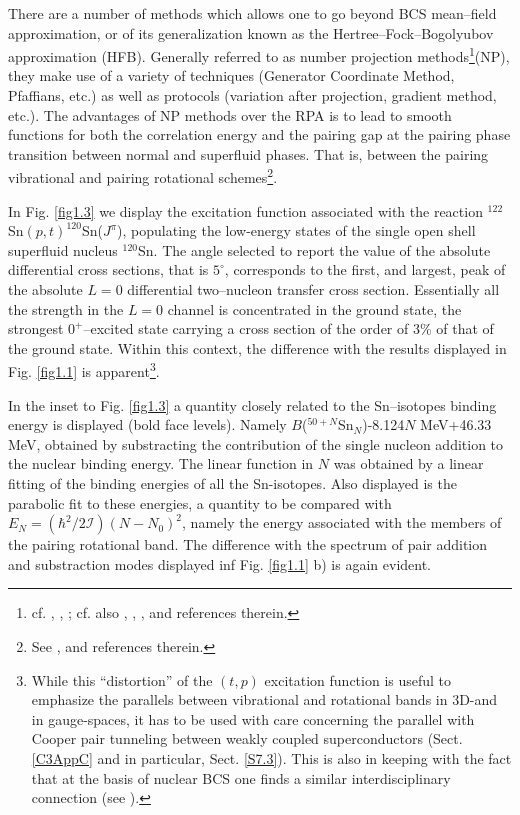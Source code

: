   
  There are a number of methods which allows one to go beyond BCS mean--field approximation, or of its generalization known as the Hertree--Fock--Bogolyubov approximation (HFB). Generally referred to as number projection methods\footnote{cf. \cite{Ring:80}, \cite{Egido:13}, \cite{Robledo:13}; cf. also \cite{Frauendorf:13}, \cite{Ring:13}, \cite{Heenen:13}, and references therein.}(NP), they make use of a variety of techniques (Generator Coordinate Method, Pfaffians, etc.) as well as protocols (variation after projection, gradient method, etc.). The advantages of NP methods over the RPA is to lead to smooth functions for both the correlation energy and the pairing gap at the pairing phase transition between normal and superfluid phases. That is, between the pairing vibrational and pairing rotational schemes\footnote{See \cite{Bes:66}, \cite{Bohr:75} and references therein.}.
  
  In Fig. \ref{fig1.3} we display the excitation function associated with the reaction $^{122}$Sn$(p,t)^{120}$Sn($J^\pi$), populating the low-energy states of the single open shell  superfluid nucleus $^{120}$Sn. The angle selected to report the value of the absolute differential cross sections, that is $5^\circ$, corresponds to the first, and largest, peak of the absolute $L=0$ differential two--nucleon transfer cross section. Essentially all the strength in the $L=0$ channel is concentrated in the ground state, the strongest $0^+$--excited state carrying a cross section of the order of 3\% of that of the ground state. Within this context, the difference with the results displayed in Fig. \ref{fig1.1} is apparent\footnote{\label{f19} While this ``distortion'' of the $(t,p)$ excitation function is useful to emphasize the parallels between vibrational and rotational bands in 3D-and in gauge-spaces, it has to be used with care concerning the parallel with Cooper pair tunneling between weakly coupled superconductors (Sect. \ref{C3AppC} and in particular, Sect. \ref{S7.3}). This is also in keeping with the fact that at the basis of nuclear BCS one finds a similar interdisciplinary connection (see \cite{Bohr:58}).}.
  
  In the inset to Fig. \ref{fig1.3} a quantity closely related to the Sn--isotopes binding energy is displayed (bold face levels). Namely $B$($^{50+N}$Sn$_N$)-8.124$N$ MeV+46.33 MeV, obtained by substracting the contribution of the single nucleon addition to the nuclear binding energy. The linear function in $N$ was obtained by a linear fitting of the binding energies of all the Sn-isotopes. 
  Also displayed is the parabolic fit to these energies, a quantity to be compared with $E_N=(\hbar^2/2\mathcal I)(N-N_0)^2$, namely the energy associated with the members of the pairing rotational band. The difference with the spectrum of pair addition and substraction modes displayed inf Fig. \ref{fig1.1} b) is again evident.
  
